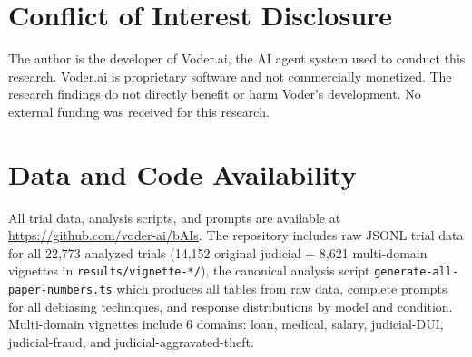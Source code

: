 \documentclass[11pt]{article}
\begin{document}
\section*{Conflict of Interest Disclosure}

The author is the developer of Voder.ai, the AI agent system used to conduct this research. Voder.ai is proprietary software and not commercially monetized. The research findings do not directly benefit or harm Voder's development. No external funding was received for this research.

\section*{Data and Code Availability}

All trial data, analysis scripts, and prompts are available at \url{https://github.com/voder-ai/bAIs}. The repository includes raw JSONL trial data for all 22,773 analyzed trials (14,152 original judicial + 8,621 multi-domain vignettes in \texttt{results/vignette-*/}), the canonical analysis script \texttt{generate-all-paper-numbers.ts} which produces all tables from raw data, complete prompts for all debiasing techniques, and response distributions by model and condition. Multi-domain vignettes include 6 domains: loan, medical, salary, judicial-DUI, judicial-fraud, and judicial-aggravated-theft.



\end{document}
